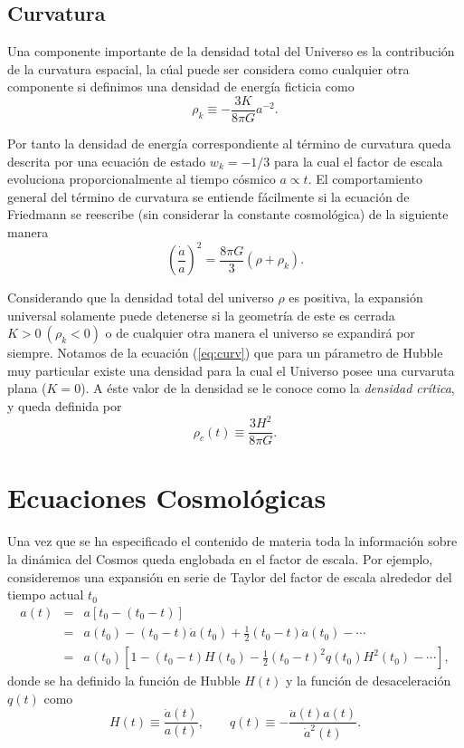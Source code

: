 \documentclass[10.5pt,prb,
               showpacs,            %
               preprintnumbers,     %
               aps,                 %
               prl,          	    %
               letterpaper,             %
               superscriptaddress,      %
               nofootinbib,         %
               tightenlines,        %
               floats,floatfix      %
               ,usenatbib]{revtex4-1}%
\def\beq{\begin{equation}}
\def\eeq{\end{equation}}
\begin{document}
\subsection*{Curvatura} 

Una componente importante de la densidad total del Universo es la contribuci\'on de la curvatura 
espacial, la c\'ual puede ser considera como cualquier otra componente
si definimos una densidad de energ\'ia ficticia como  
%
	\beq
		\rho_k \equiv -\frac{3K}{8\pi G}a^{-2}.
	\eeq

\noindent
Por tanto la densidad de energ\'ia correspondiente al t\'ermino de curvatura queda descrita por 
una ecuaci\'on de estado $w_k=-1/3$ para la cual el factor de escala evoluciona proporcionalmente 
al tiempo c\'osmico $a\propto t$. El comportamiento general del t\'ermino de curvatura se 
entiende f\'acilmente si la ecuaci\'on de Friedmann se reescribe (sin considerar la constante cosmol\'ogica) 
de la siguiente manera
%
	\beq \label{eq:curv}
		\left( \frac{\dot a}{a} \right)^2 = \frac{8 \pi G}{3}(\rho+\rho_k).
	\eeq

\noindent
Considerando que la densidad total del universo $\rho$ es positiva, la expansi\'on universal solamente puede detenerse 
si la geometr\'ia de este es cerrada $K>0~ (\rho_k <0)$ o de cualquier otra manera el universo se expandir\'a por siempre. 
Notamos de la ecuaci\'on (\ref{eq:curv}) que para un p\'arametro de Hubble muy particular existe una densidad para la cual el Universo 
posee una curvaruta plana ($K=0$). A \'este valor de la densidad se le conoce como la \textit{densidad cr\'itica}, y queda definida por
%
	\beq
		\rho_c(t) \equiv \frac{3H^2}{8 \pi G}.
	\eeq


\section{Ecuaciones Cosmol\'ogicas}

Una vez que se ha especificado el contenido de materia toda la informaci\'on sobre la din\'amica del Cosmos 
queda englobada en el factor de escala.
Por ejemplo, consideremos una expansi\'on en serie de Taylor del factor de escala alrededor del tiempo
actual $t_0$
%
	\begin{eqnarray}
		a(t) &=& a[t_0 - (t_0 - t)] \\
		       &=& a(t_0) - (t_0-t)\dot a(t_0) + \frac{1}{2}(t_0 - t)\ddot a(t_0) - \cdots \\
		       &=& a(t_0)[1 - (t_0-t)H(t_0)- \frac{1}{2}(t_0 - t)^2q(t_0)H^2(t_0)- \cdots],
	\end{eqnarray}
%
donde se ha definido la funci\'on de Hubble $H(t)$ y la funci\'on de desaceleraci\'on $q(t)$ como
%
	\beq
		H(t) \equiv \frac{\dot a (t)}{a(t)}, \qquad q(t) \equiv -\frac{\ddot a(t) a(t)}{\dot a^2(t)}.
	\eeq
\end{document}
